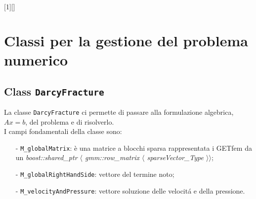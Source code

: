 [1][]{}{}

\chapter{Classi per la gestione del problema numerico}

\section{Class \texttt{DarcyFracture}}
La classe \texttt{DarcyFracture} ci permette di passare alla formulazione algebrica, $ Ax=b $, del problema e di risolverlo. \\ 

I campi fondamentali della classe sono:
	\begin{enumerate}
	\item[-] \texttt{M\_globalMatrix}: \`{e} una matrice a blocchi sparsa rappresentata i GETfem da un \textit{boost::shared\_ptr $\langle$ gmm::row\_matrix $\langle$ sparseVector\_Type $\rangle \rangle$};
	\item[-] \texttt{M\_globalRightHandSide}: vettore del termine noto;
	\item[-] \texttt{M\_velocityAndPressure}: vettore soluzione delle velocit\'{a} e della pressione.
	\end{enumerate} 

